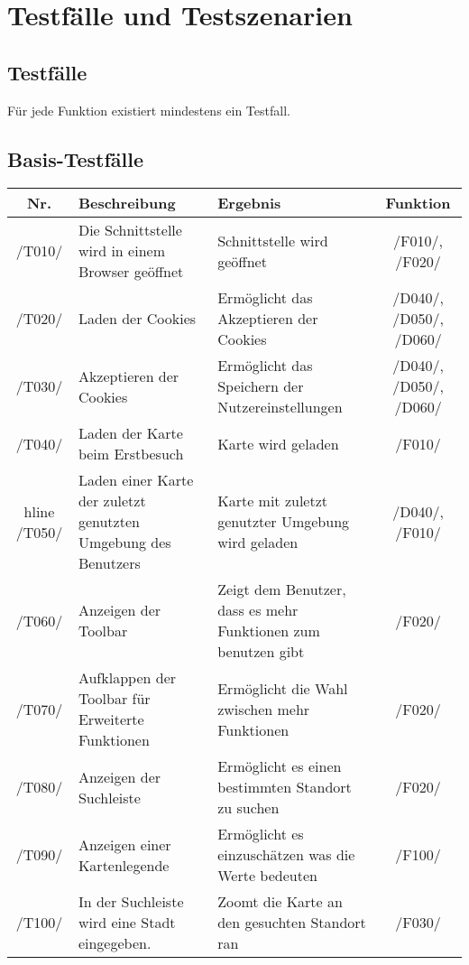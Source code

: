\section{Testfälle und Testszenarien}
\subsection{Testfälle}

Für jede Funktion existiert mindestens ein Testfall.
\newline
\subsection{Basis-Testfälle}
\begin{tabularx}{\textwidth}{| c | X | X | c |}
    \hline
    \textbf{Nr.} & 
    \textbf{Beschreibung} &
    \textbf{Ergebnis} &
    \textbf{Funktion}\\
    \hline
    /T010/ & Die Schnittstelle wird in einem Browser geöffnet & Schnittstelle wird geöffnet & /F010/, /F020/ \\
    \hline
    /T020/ & Laden der \glspl{Cookie} & Ermöglicht das Akzeptieren der \glspl{Cookie} & /D040/, /D050/, /D060/ \\
    \hline
    /T030/ & Akzeptieren der \glspl{Cookie} & Ermöglicht das Speichern der Nutzereinstellungen & /D040/, /D050/, /D060/ \\
    \hline
    /T040/ & Laden der Karte beim Erstbesuch & Karte wird geladen & /F010/ \\
     hline
    /T050/ & Laden einer Karte der zuletzt genutzten Umgebung des Benutzers & Karte mit zuletzt genutzter Umgebung wird geladen & /D040/, /F010/ \\
    \hline
    /T060/ & Anzeigen der \gls{Toolbar} & Zeigt dem Benutzer, dass es mehr Funktionen zum benutzen gibt & /F020/ \\
    \hline
    /T070/ & Aufklappen der \gls{Toolbar} für Erweiterte Funktionen & Ermöglicht die Wahl zwischen mehr Funktionen & /F020/ \\
    \hline
    /T080/ & Anzeigen der Suchleiste & Ermöglicht es einen bestimmten Standort zu suchen & /F020/ \\
    \hline
    /T090/ & Anzeigen einer Kartenlegende & Ermöglicht es einzuschätzen was die Werte bedeuten & /F100/ \\
    \hline
    /T100/ & In der Suchleiste wird eine Stadt eingegeben. & Zoomt die Karte an den gesuchten Standort ran & /F030/ \\

\end{tabularx}
